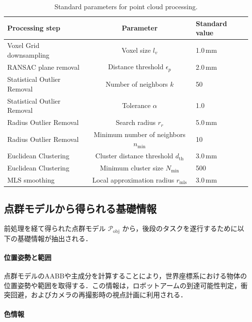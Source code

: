 \begin{table}[t]
  \centering
  \caption{Standard parameters for point cloud processing.}
  \label{tab:system:pointcloud-parameters}
  \begin{tabular}{lcl}
    \toprule
    \textbf{Processing step} & \textbf{Parameter} & \textbf{Standard value} \\
    \midrule
    Voxel Grid downsampling & Voxel size $l_v$ & 1.0\,mm \\
    RANSAC plane removal & Distance threshold $\epsilon_p$ & 2.0\,mm \\
    Statistical Outlier Removal & Number of neighbors $k$ & 50 \\
    Statistical Outlier Removal & Tolerance $\alpha$ & 1.0 \\
    Radius Outlier Removal & Search radius $r_r$ & 5.0\,mm \\
    Radius Outlier Removal & Minimum number of neighbors $n_{\min}$ & 10 \\
    Euclidean Clustering & Cluster distance threshold $d_{\mathrm{th}}$ & 3.0\,mm \\
    Euclidean Clustering & Minimum cluster size $N_{\min}$ & 500 \\
    MLS smoothing & Local approximation radius $r_{\mathrm{mls}}$ & 3.0\,mm \\
    \bottomrule
  \end{tabular}
\end{table}

\subsection{点群モデルから得られる基礎情報}
\label{sec:system:pointcloud:basic-information}
前処理を経て得られた点群モデル $\mathcal{P}_{\mathrm{obj}}$ から，後段のタスクを遂行するために以下の基礎情報が抽出される．

\paragraph{位置姿勢と範囲}

点群モデルのAABBや主成分を計算することにより，世界座標系における物体の位置姿勢や範囲を取得する．この情報は，ロボットアームの到達可能性判定，衝突回避，およびカメラの再撮影時の視点計画に利用される．

\paragraph{色情報}

